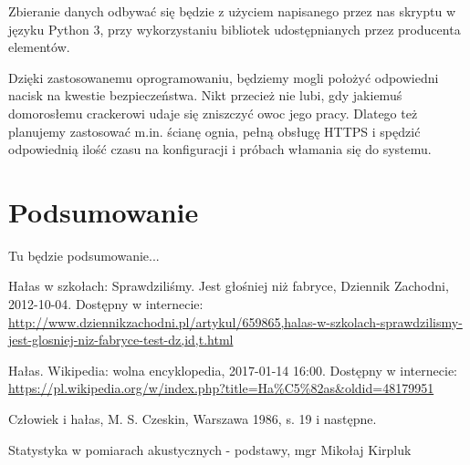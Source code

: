 \documentclass[12pt, a4paper]{article}
\begin{document}
Zbieranie danych odbywać się będzie z użyciem napisanego przez nas skryptu w języku Python 3, przy wykorzystaniu bibliotek udostępnianych przez producenta elementów. 

Dzięki zastosowanemu oprogramowaniu, będziemy mogli położyć odpowiedni nacisk na kwestie bezpieczeństwa. Nikt przecież nie lubi, gdy jakiemuś domorosłemu crackerowi udaje się zniszczyć owoc jego pracy. Dlatego też planujemy zastosować m.in. {\color{red}ścianę ognia}, pełną obsługę HTTPS i spędzić odpowiednią ilość czasu na konfiguracji i próbach włamania się do systemu.

\section{Podsumowanie}

Tu będzie podsumowanie...

\begin{thebibliography}{9}

  Hałas w szkołach: Sprawdziliśmy. Jest głośniej niż fabryce, Dziennik Zachodni, 2012-10-04. Dostępny w internecie: \url{http://www.dziennikzachodni.pl/artykul/659865,halas-w-szkolach-sprawdzilismy-jest-glosniej-niz-fabryce-test-dz,id,t.html}

  Hałas. Wikipedia: wolna encyklopedia, 2017-01-14 16:00. Dostępny w internecie: \url{https://pl.wikipedia.org/w/index.php?title=Ha%C5%82as&oldid=48179951}
  
  Człowiek i hałas, M. S. Czeskin, Warszawa 1986, s. 19 i następne.
  
  Statystyka w pomiarach akustycznych - podstawy, mgr Mikołaj Kirpluk
\end{thebibliography}
\end{document}
